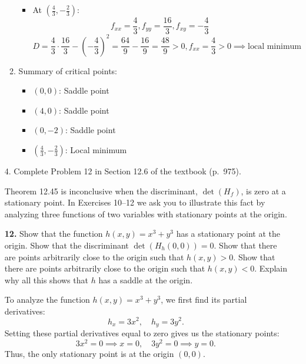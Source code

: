 \documentclass[reqno, 12pt]{amsart}
\begin{document}
\begin{itemize}
\begin{answerbox}
\begin{enumerate}
\begin{itemize}
            \item At \((\frac{4}{3},-\frac{2}{3})\):
              \[f_{xx} = \frac{4}{3}, f_{yy} = \frac{16}{3}, f_{xy} = -\frac{4}{3}\]
              \[D = \frac{4}{3} \cdot \frac{16}{3} - \left(-\frac{4}{3}\right)^2 = \frac{64}{9} - \frac{16}{9} = \frac{48}{9} > 0, f_{xx} = \frac{4}{3} > 0 \implies \text{local minimum}\]
          \end{itemize}
        \item Summary of critical points:
          \begin{itemize}
            \item \((0,0)\): Saddle point
            \item \((4,0)\): Saddle point
            \item \((0,-2)\): Saddle point
            \item \((\frac{4}{3},-\frac{2}{3})\): Local minimum
          \end{itemize}
      \end{enumerate}
    \end{answerbox}
    \vspace{0.5 in}
  \item[4.] Complete Problem 12 in Section 12.6 of the textbook (p.~975).
    \newline

    Theorem 12.45 is inconclusive when the discriminant, $\det(H_f)$,
    is zero at a stationary point. In Exercises 10--12 we ask you to
    illustrate this fact by analyzing three functions of two variables
    with stationary points at the origin.
    \newline

    \textbf{12.} Show that the function $h(x, y) = x^3 + y^3$ has a
    stationary point at the origin. Show that the discriminant
    $\det(H_h(0, 0)) = 0$. Show that there are points arbitrarily
    close to the origin such that $h(x, y) > 0$. Show that there
    are points arbitrarily close to the origin such that
    $h(x, y) < 0$. Explain why all this shows that $h$ has a saddle
    at the origin.
    \newline

    \begin{answerbox}
      To analyze the function \(h(x, y) = x^3 + y^3\), we first find its partial derivatives:
      \[
        h_x = 3x^2, \quad h_y = 3y^2.
      \]
      Setting these partial derivatives equal to zero gives us the stationary points:
      \[
        3x^2 = 0 \implies x = 0, \quad 3y^2 = 0 \implies y = 0.
      \]
      Thus, the only stationary point is at the origin \((0, 0)\).


\end{answerbox}
\end{itemize}
\end{document}
